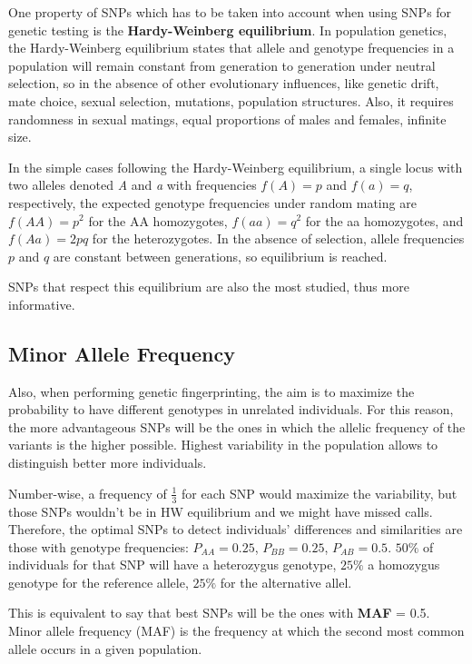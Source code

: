 One property of SNPs which has to be taken into account when using SNPs for
genetic testing is the \textbf{Hardy-Weinberg equilibrium}. In population
genetics, the Hardy-Weinberg equilibrium states that allele and genotype
frequencies in a population will remain constant from generation to generation
under neutral selection, so in the absence of other evolutionary influences,
like genetic drift, mate choice, sexual selection, mutations, population
structures. Also, it requires randomness in sexual matings, equal proportions of
males and females, infinite size.

In the simple cases following the Hardy-Weinberg equilibrium, a single locus
with two alleles denoted \emph{A} and \emph{a} with frequencies $f(A) = p$ and
$f(a) = q$, respectively, the expected genotype frequencies under random mating
are $f(AA) = p^{2}$ for the AA homozygotes, $f(aa) = q^{2}$ for the aa
homozygotes, and $f(Aa) = 2pq$ for the heterozygotes. In the absence of
selection, allele frequencies $p$ and $q$ are constant between generations, so
equilibrium is reached. 

SNPs that respect this equilibrium are also the most studied, thus more
informative. 

\subsection{Minor Allele Frequency}

Also, when performing genetic fingerprinting, the aim is to maximize the
probability to have different genotypes in unrelated individuals. For this
reason, the more advantageous SNPs will be the ones in which the allelic
frequency of the variants is the higher possible. Highest variability in the
population allows to distinguish better more individuals. 

Number-wise, a frequency of $\frac{1}{3}$ for each SNP would maximize the
variability, but those SNPs wouldn't be in HW equilibrium and we might have
missed calls. Therefore, the optimal SNPs to detect individuals’ differences and
similarities are those with genotype frequencies: $P_{AA} = 0.25$, $P_{BB} =
0.25$, $P_{AB} = 0.5$. $50\%$ of individuals for that SNP will have a
heterozygus genotype, $25\%$ a homozygus genotype for the reference allele,
$25\%$ for the alternative allel.

This is equivalent to say that best SNPs will be the ones with \textbf{MAF} =
0.5. Minor allele frequency (MAF) is the frequency at which the second most
common allele occurs in a given population.

